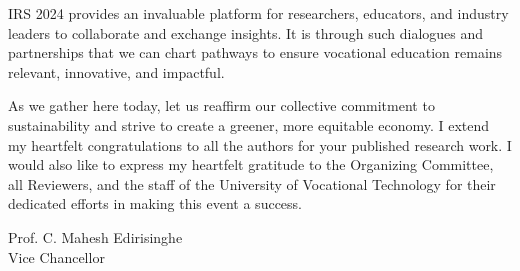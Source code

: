 IRS 2024 provides an invaluable platform for researchers, educators, and industry leaders to collaborate and exchange insights. It is through such dialogues and partnerships that we can chart pathways to ensure vocational education remains relevant, innovative, and impactful.  

As we gather here today, let us reaffirm our collective commitment to sustainability and strive to create a greener, more equitable economy. I extend my heartfelt congratulations to all the authors for your published research work. I would also like to express my heartfelt gratitude to the Organizing Committee, all Reviewers, and the staff of the University of Vocational Technology for their dedicated efforts in making this event a success.   


	\noindent
	Prof. C. Mahesh Edirisinghe\\
	Vice Chancellor
	
	\newpage
	